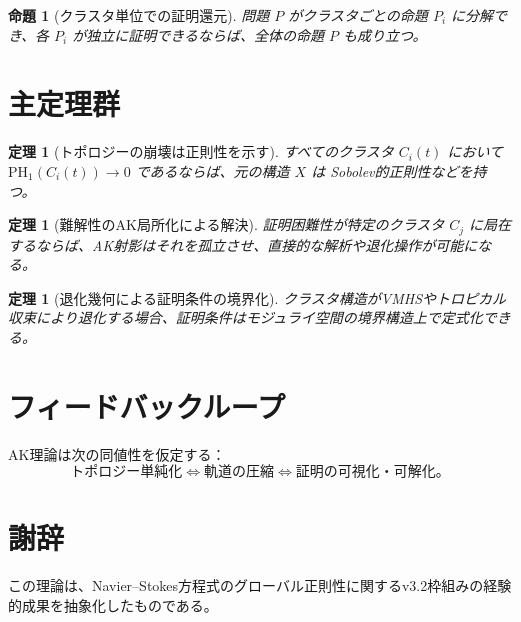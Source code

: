 \documentclass[11pt]{article}
\newtheorem{proposition}[definition]{命題}
\newtheorem{theorem}[definition]{定理}
\begin{document}
\begin{proposition}[クラスタ単位での証明還元]
問題 $P$ がクラスタごとの命題 $P_i$ に分解でき、各 $P_i$ が独立に証明できるならば、全体の命題 $P$ も成り立つ。
\end{proposition}

\section{主定理群}

\begin{theorem}[トポロジーの崩壊は正則性を示す]
すべてのクラスタ $C_i(t)$ において $\mathrm{PH}_1(C_i(t)) \to 0$ であるならば、元の構造 $X$ は Sobolev的正則性などを持つ。
\end{theorem}

\begin{theorem}[難解性のAK局所化による解決]
証明困難性が特定のクラスタ $C_j$ に局在するならば、AK射影はそれを孤立させ、直接的な解析や退化操作が可能になる。
\end{theorem}

\begin{theorem}[退化幾何による証明条件の境界化]
クラスタ構造がVMHSやトロピカル収束により退化する場合、証明条件はモジュライ空間の境界構造上で定式化できる。
\end{theorem}

\section{フィードバックループ}

AK理論は次の同値性を仮定する：
\[
\text{トポロジー単純化} \Longleftrightarrow \text{軌道の圧縮} \Longleftrightarrow \text{証明の可視化・可解化}。
\]

\section*{謝辞}
この理論は、Navier--Stokes方程式のグローバル正則性に関するv3.2枠組みの経験的成果を抽象化したものである。
\end{document}
